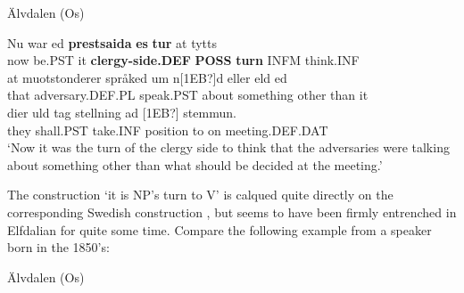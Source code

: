 
\item 

\label{bkm:Ref135470135}Älvdalen (Os)



 \ea\label{}
\gll Nu  war  ed  \textbf{prestsaida} \textbf{es} \textbf{tur} at  tytts\\


now  be.PST  it  \textbf{clergy-side.DEF} \textbf{POSS} \textbf{turn} INFM  think.INF\\

 \ea\label{}
\gll at  muotstonderer  språked  um  n[1EB?]d  eller  eld  ed\\


that  adversary.DEF.PL  speak.PST  about  something  other  than  it\\

 \ea\label{}
\gll dier  uld  tag  stellning  ad  [1EB?]  stemmun.\\


they  shall.PST  take.INF  position  to  on  meeting.DEF.DAT\\

\glt ‘Now it was the turn of the clergy side to think that the adversaries were talking about something other than what should be decided at the meeting.’ 

\z

The construction  ‘it is NP’s turn to V’ is calqued quite directly on the corresponding Swedish construction , but seems to have been firmly entrenched in Elfdalian for quite some time. Compare the following example from a speaker born in the 1850’s:


\item 

\label{bkm:Ref135470154}Älvdalen (Os)

